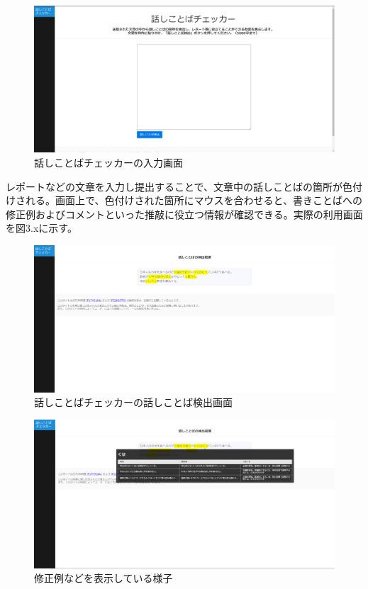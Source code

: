 \begin{figure}[H]
	\centering
 	\includegraphics[width=150mm]{image/checkerss-plain.png}
	\caption{話しことばチェッカーの入力画面}
	\label{checkerss-plain}
\end{figure}

レポートなどの文章を入力し提出することで、文章中の話しことばの箇所が色付けされる。画面上で、色付けされた箇所にマウスを合わせると、書きことばへの修正例およびコメントといった推敲に役立つ情報が確認できる。実際の利用画面を図3.xに示す。

\begin{figure}[H]
	\centering
 	\includegraphics[width=150mm]{image/checkerss-result.png}
	\caption{話しことばチェッカーの話しことば検出画面}
	\label{checkerss-plain}
\end{figure}

\begin{figure}[H]
	\centering
 	\includegraphics[width=150mm]{image/checkerss-popout.png}
	\caption{修正例などを表示している様子}
	\label{checkerss-plain}
\end{figure}



